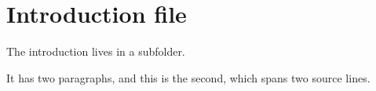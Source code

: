 \section{Introduction file}
The introduction lives in a subfolder.

It has two paragraphs, and this is the second,
which spans two source lines.

